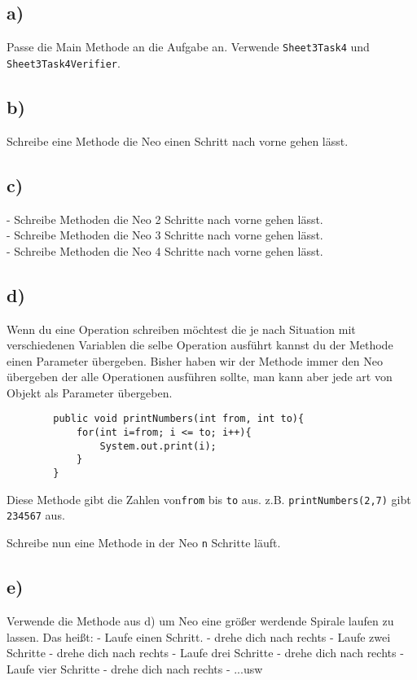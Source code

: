 \subsection*{a)}
	Passe die Main Methode an die Aufgabe an. Verwende \lstinline{Sheet3Task4} und \lstinline{Sheet3Task4Verifier}.
\subsection*{b)}
	Schreibe eine Methode die Neo einen Schritt nach vorne gehen lässt.
\subsection*{c)}
	- Schreibe Methoden die Neo 2 Schritte nach vorne gehen lässt.\\
	- Schreibe Methoden die Neo 3 Schritte nach vorne gehen lässt.\\
	- Schreibe Methoden die Neo 4 Schritte nach vorne gehen lässt.
\subsection*{d)}
	\begin{Infobox}
		Wenn du eine Operation schreiben möchtest die je nach Situation mit verschiedenen Variablen die selbe Operation ausführt kannst du der Methode einen Parameter übergeben. Bisher haben wir der Methode immer den Neo übergeben der alle Operationen ausführen sollte, man kann aber jede art von Objekt als Parameter übergeben.
	
	\begin{lstlisting}
		public void printNumbers(int from, int to){
			for(int i=from; i <= to; i++){
				System.out.print(i);
			}
		}
	\end{lstlisting}
Diese Methode gibt die Zahlen von\lstinline{from} bis \lstinline{to} aus. z.B. \lstinline{printNumbers(2,7)} gibt  \lstinline{234567} aus.
	\end {Infobox}
Schreibe nun eine Methode in der Neo \lstinline{n} Schritte läuft.
\subsection*{e)}
Verwende die Methode aus d) um Neo eine größer werdende Spirale laufen zu lassen. Das heißt:
- Laufe einen Schritt.
- drehe dich nach rechts
- Laufe zwei Schritte
- drehe dich nach rechts
- Laufe drei Schritte
- drehe dich nach rechts
- Laufe vier Schritte
- drehe dich nach rechts
- ...usw

